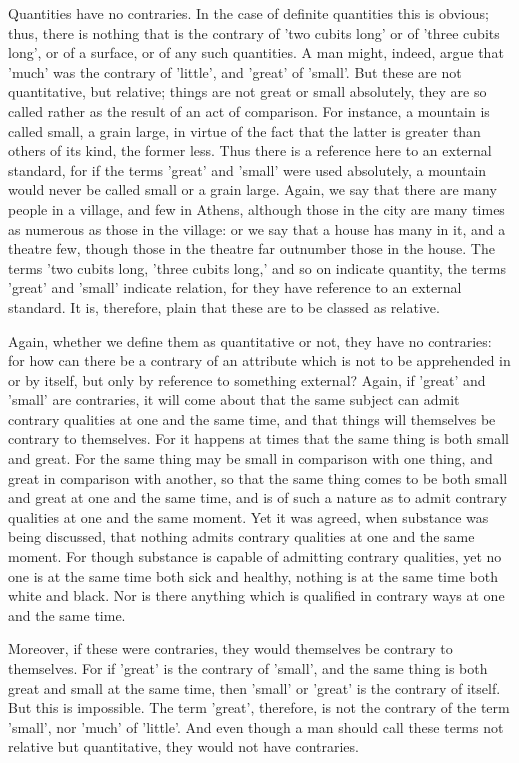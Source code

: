 Quantities have no contraries. In the case of definite quantities this
is obvious; thus, there is nothing that is the contrary of 'two cubits
long' or of 'three cubits long', or of a surface, or of any such
quantities. A man might, indeed, argue that 'much' was the contrary of
'little', and 'great' of 'small'. But these are not quantitative, but
relative; things are not great or small absolutely, they are so called
rather as the result of an act of comparison. For instance, a mountain
is called small, a grain large, in virtue of the fact that the latter
is greater than others of its kind, the former less. Thus there is a
reference here to an external standard, for if the terms 'great' and
'small' were used absolutely, a mountain would never be called small or
a grain large. Again, we say that there are many people in a village,
and few in Athens, although those in the city are many times as
numerous as those in the village: or we say that a house has many in
it, and a theatre few, though those in the theatre far outnumber those
in the house. The terms 'two cubits long, 'three cubits long,' and so
on indicate quantity, the terms 'great' and 'small' indicate relation,
for they have reference to an external standard. It is, therefore,
plain that these are to be classed as relative.

Again, whether we define them as quantitative or not, they have no
contraries: for how can there be a contrary of an attribute which is
not to be apprehended in or by itself, but only by reference to
something external? Again, if 'great' and 'small' are contraries, it
will come about that the same subject can admit contrary qualities at
one and the same time, and that things will themselves be contrary to
themselves. For it happens at times that the same thing is both small
and great. For the same thing may be small in comparison with one
thing, and great in comparison with another, so that the same thing
comes to be both small and great at one and the same time, and is of
such a nature as to admit contrary qualities at one and the same
moment. Yet it was agreed, when substance was being discussed, that
nothing admits contrary qualities at one and the same moment. For
though substance is capable of admitting contrary qualities, yet no one
is at the same time both sick and healthy, nothing is at the same time
both white and black. Nor is there anything which is qualified in
contrary ways at one and the same time.

Moreover, if these were contraries, they would themselves be contrary
to themselves. For if 'great' is the contrary of 'small', and the same
thing is both great and small at the same time, then 'small' or 'great'
is the contrary of itself. But this is impossible. The term 'great',
therefore, is not the contrary of the term 'small', nor 'much' of
'little'. And even though a man should call these terms not relative
but quantitative, they would not have contraries.

